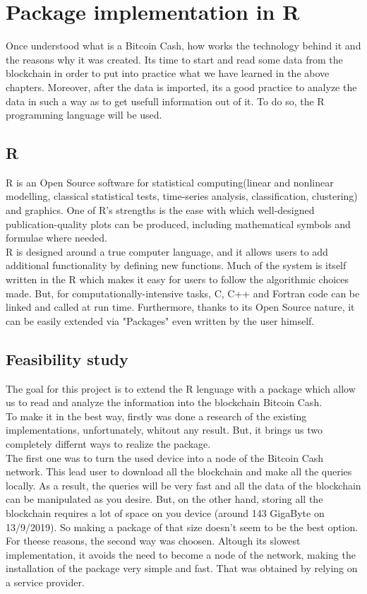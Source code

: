 
\chapter{Package implementation in R}
\label{cha:R}

Once understood what is a Bitcoin Cash, how works the technology behind it and the
reasons why it was created. Its time to start and read some data from the blockchain
in order to put into practice what we have learned in the above chapters. Moreover,
after the data is imported, its a good practice to analyze the data in such a way as to 
get usefull information out of it. To do so, the R programming language will be used.

\section{R}
\label{sec:enivirionment}

R is an Open Source software for statistical computing(linear and nonlinear
 modelling, classical statistical tests, time-series analysis, classification,
 clustering) and graphics. One of R’s strengths is the ease with which well-designed 
 publication-quality plots can be produced, including mathematical symbols and 
 formulae where needed.\\
R is designed around a true computer language, and it allows users to add additional 
functionality by defining new functions. Much of the system is itself written in the 
R which makes it easy for users to follow the algorithmic choices made. But, for
computationally-intensive tasks, C, C++ and Fortran code can be linked and called 
at run time. Furthermore, thanks to its Open Source nature, it can be easily extended
via "Packages" even written by the user himself.\cite{r}

\section{Feasibility study}
\label{sec:study}

The goal for this project is to extend the R lenguage with a package which allow us
to read and analyze the information into the blockchain Bitcoin Cash.\\
To make it in the best way, firstly was done a research of the existing 
implementations, unfortunately, whitout any result. But, it brings us two 
completely differnt ways to realize the package. \\
The first one was to turn the used device into a node of the Bitcoin Cash network.
This lead user to download all the blockchain and make all the queries locally.
As a result, the queries will be very fast and all the data of the blockchain can
be manipulated as you desire. But, on the other hand, storing all the blockchain 
requires a lot of space on you device (around 143 GigaByte on 13/9/2019). So making
a package of that size doesn't seem to be the best option.\\
For theese reasons, the second way was choosen. Altough its slowest implementation,
it avoids the need to become a node of the network, making the installation of the
package very simple and fast. That was obtained by relying on a service provider.

